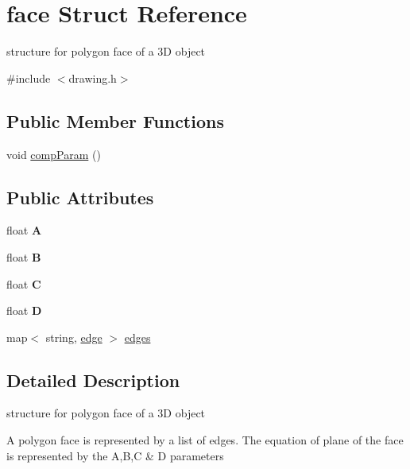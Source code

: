 \hypertarget{structface}{}\section{face Struct Reference}
\label{structface}


structure for polygon face of a 3D object  




{\ttfamily \#include $<$drawing.\+h$>$}

\subsection*{Public Member Functions}
\begin{DoxyCompactItemize}
\item 
void \mbox{\hyperlink{structface_a9824194eb850dd3b7495b959075e2e01}{comp\+Param}} ()
\end{DoxyCompactItemize}
\subsection*{Public Attributes}
\begin{DoxyCompactItemize}
\item 
\mbox{\label{structface_a1091483a325e1f823c3723b9dad942eb}} 
float {\bfseries A}
\item 
\mbox{\label{structface_a70317a6c8d81b4ee406025aadf7f9487}} 
float {\bfseries B}
\item 
\mbox{\label{structface_af381ff59cc598f4e6d31a008dee13284}} 
float {\bfseries C}
\item 
\mbox{\label{structface_afaa376f0d0dabf12a9832165bd5f00ab}} 
float {\bfseries D}
\item 
map$<$ string, \mbox{\hyperlink{structedge}{edge}} $>$ \mbox{\hyperlink{structface_ac8a0c9860a641b73d3bbcdf18e18df14}{edges}}
\end{DoxyCompactItemize}


\subsection{Detailed Description}
structure for polygon face of a 3D object 

A polygon face is represented by a list of edges. The equation of plane of the face is represented by the A,B,C \& D parameters 

